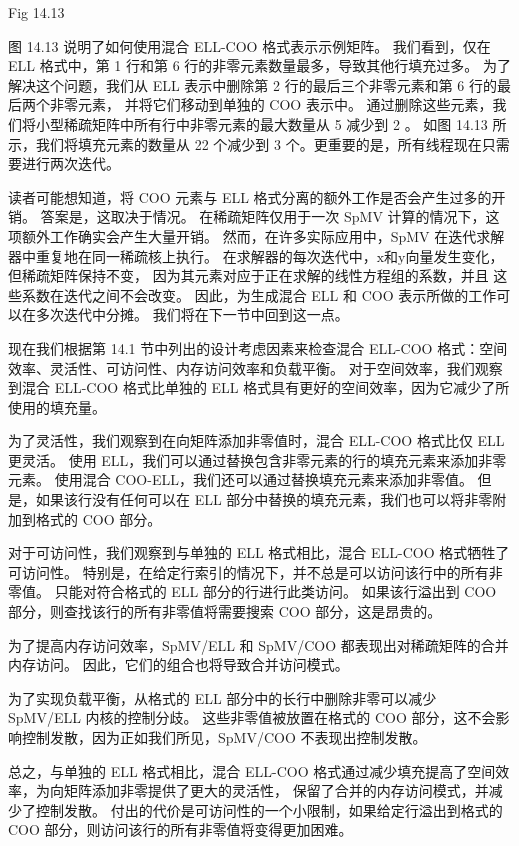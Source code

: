 {\color{red} Fig 14.13}

图 14.13 说明了如何使用混合 ELL-COO 格式表示示例矩阵。 
我们看到，仅在 ELL 格式中，第 1 行和第 6 行的非零元素数量最多，导致其他行填充过多。 
为了解决这个问题，我们从 ELL 表示中删除第 2 行的最后三个非零元素和第 6 行的最后两个非零元素，
并将它们移动到单独的 $\mathrm{COO}$ 表示中。 
通过删除这些元素，我们将小型稀疏矩阵中所有行中非零元素的最大数量从 5 减少到 2 。 
如图 14.13 所示，我们将填充元素的数量从 22 个减少到 3 个。更重要的是，所有线程现在只需要进行两次迭代。

读者可能想知道，将 COO 元素与 ELL 格式分离的额外工作是否会产生过多的开销。 答案是，这取决于情况。 
在稀疏矩阵仅用于一次 SpMV 计算的情况下，这项额外工作确实会产生大量开销。 
然而，在许多实际应用中，SpMV 在迭代求解器中重复地在同一稀疏核上执行。 
在求解器的每次迭代中，$\mathrm{x}$和$\mathrm{y}$向量发生变化，但稀疏矩阵保持不变，
因为其元素对应于正在求解的线性方程组的系数，并且 这些系数在迭代之间不会改变。 
因此，为生成混合 ELL 和 COO 表示所做的工作可以在多次迭代中分摊。 我们将在下一节中回到这一点。

现在我们根据第 14.1 节中列出的设计考虑因素来检查混合 ELL-COO 格式：空间效率、灵活性、可访问性、内存访问效率和负载平衡。 
对于空间效率，我们观察到混合 ELL-COO 格式比单独的 ELL 格式具有更好的空间效率，因为它减少了所使用的填充量。

为了灵活性，我们观察到在向矩阵添加非零值时，混合 ELL-COO 格式比仅 ELL 更灵活。 
使用 ELL，我们可以通过替换包含非零元素的行的填充元素来添加非零元素。 
使用混合 COO-ELL，我们还可以通过替换填充元素来添加非零值。 
但是，如果该行没有任何可以在 ELL 部分中替换的填充元素，我们也可以将非零附加到格式的 COO 部分。

对于可访问性，我们观察到与单独的 ELL 格式相比，混合 ELL-COO 格式牺牲了可访问性。 
特别是，在给定行索引的情况下，并不总是可以访问该行中的所有非零值。 只能对符合格式的 ELL 部分的行进行此类访问。 
如果该行溢出到 $\mathrm{COO}$ 部分，则查找该行的所有非零值将需要搜索 $\mathrm{COO}$ 部分，这是昂贵的。

为了提高内存访问效率，SpMV/ELL 和 SpMV/COO 都表现出对稀疏矩阵的合并内存访问。 
因此，它们的组合也将导致合并访问模式。

为了实现负载平衡，从格式的 ELL 部分中的长行中删除非零可以减少 SpMV/ELL 内核的控制分歧。 
这些非零值被放置在格式的 $\mathrm{COO}$ 部分，这不会影响控制发散，因为正如我们所见，SpMV/COO 不表现出控制发散。

总之，与单独的 ELL 格式相比，混合 ELL-COO 格式通过减少填充提高了空间效率，为向矩阵添加非零提供了更大的灵活性，
保留了合并的内存访问模式，并减少了控制发散。 
付出的代价是可访问性的一个小限制，如果给定行溢出到格式的 $\mathrm{COO}$ 部分，则访问该行的所有非零值将变得更加困难。

